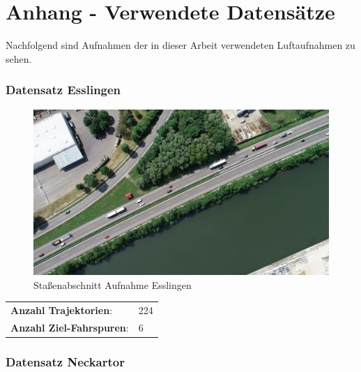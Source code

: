 
\chapter{Anhang - Verwendete Datensätze}
\label{cha:anhang_a}

Nachfolgend sind Aufnahmen der in dieser Arbeit verwendeten Luftaufnahmen zu sehen.

\subsection*{Datensatz Esslingen}

\begin{minipage}{0.55\textwidth}
    \begin{figure}[H]
        \includegraphics[width=\linewidth]{resources/img/Anhang/Entennest}
    \caption[]{Staßenabschnitt Aufnahme Esslingen}
    \label{fig:anhang_ds_entennest}
    \end{figure}
\end{minipage} \hfill
\begin{minipage}{0.35\textwidth}
    \begin{tabular}{ll}
    \textbf{Anzahl Trajektorien}: &  224 \\
    \textbf{Anzahl Ziel-Fahrspuren}: & 6 \\
    \end{tabular}
\end{minipage}

\subsection*{Datensatz Neckartor}

